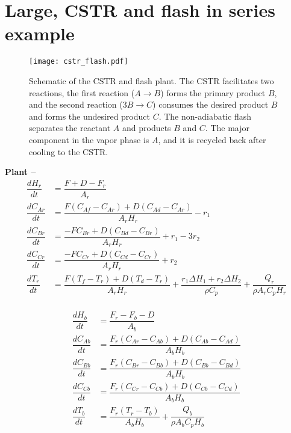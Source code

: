 \documentclass{article}
\begin{document}
\section{Large, CSTR and flash in series example}
\begin{figure}[!h]
  \centering
  \texttt{[image: cstr\_flash.pdf]}
  \caption{Schematic of the CSTR and flash plant. The CSTR facilitates two 
  reactions, the first reaction ($A \rightarrow B$) forms the primary product $B$, and the second reaction ($3B \rightarrow C$) 
  consumes the desired product $B$ and forms the undesired product $C$.
  The non-adiabatic flash separates the reactant $A$ and 
  products $B$ and $C$. The major component in the vapor phase 
  is $A$, and it is recycled back after cooling to the CSTR.}
  \label{fig:cstr_flash}
\end{figure}
\textbf{Plant -- }
\begin{align*}
  \dfrac{dH_r}{dt} &= \dfrac{F + D -F_r}{A_r}\\
  \dfrac{dC_{Ar}}{dt} &= \dfrac{F(C_{Af} -C_{Ar}) +
                         D(C_{Ad} -C_{Ar})}{A_rH_r} - r_1 \\
  \dfrac{dC_{Br}}{dt} &= \dfrac{-FC_{Br} + 
                          D(C_{Bd} -C_{Br})}{A_rH_r} + r_1 -3r_2\\
  \dfrac{dC_{Cr}}{dt} &= \dfrac{-FC_{Cr} + 
  D(C_{Cd} -C_{Cr})}{A_rH_r} + r_2\\
  \dfrac{dT_r}{dt} &= \dfrac{F(T_f - T_r) + D(T_d -T_r)}{A_rH_r} + 
                      \dfrac{r_1\Delta H_1 + r_2\Delta H_2}{\rho C_p} + 
                      \dfrac{Q_r}{\rho A_r C_p H_r}\\
\end{align*}

\begin{align*}
  \dfrac{dH_b}{dt} &= \dfrac{F_r - F_b - D}{A_b} \\
  \dfrac{dC_{Ab}}{dt} &= \dfrac{F_r(C_{Ar} -C_{Ab}) + 
                          D(C_{Ab} -C_{Ad})}{A_bH_b} \\
  \dfrac{dC_{Bb}}{dt} &= \dfrac{F_r(C_{Br} -C_{Bb}) + 
                          D(C_{Bb} -C_{Bd})}{A_bH_b} \\
  \dfrac{dC_{Cb}}{dt} &= \dfrac{F_r(C_{Cr} -C_{Cb}) + 
                          D(C_{Cb} -C_{Cd})}{A_bH_b} \\
  \dfrac{dT_b}{dt} &= \dfrac{F_r(T_r - T_b)}{A_bH_b} +
                      \dfrac{Q_b}{\rho A_b C_p H_b}\\
\end{align*}
\end{document}
